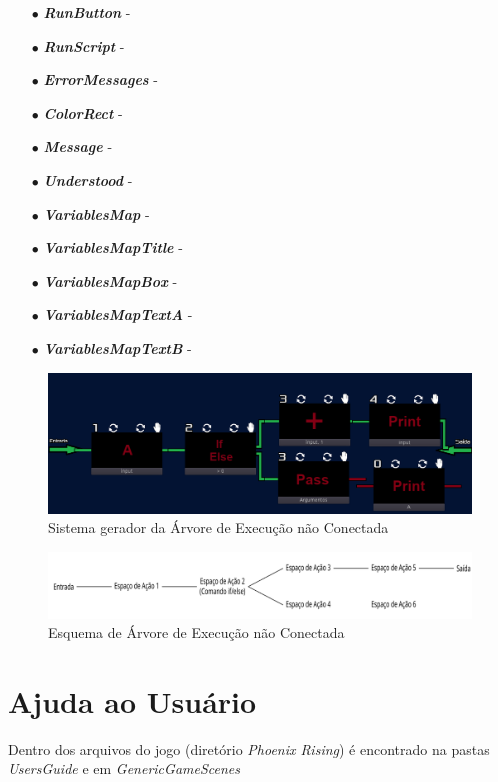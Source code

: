 \begin{itemize}
    \item[$\bullet$]
        \textbf{\textit{RunButton}} -
    \item[$\bullet$]
        \textbf{\textit{RunScript}} - 
    \item[$\bullet$]
        \textbf{\textit{ErrorMessages}} - 
    \item[$\bullet$] 
        \textbf{\textit{ColorRect}} - 
    \item[$\bullet$]
        \textbf{\textit{Message}} - 
    \item[$\bullet$]
        \textbf{\textit{Understood}} - 
    \item[$\bullet$] 
        \textbf{\textit{VariablesMap}} - 
    \item[$\bullet$] 
        \textbf{\textit{VariablesMapTitle}} - 
    \item[$\bullet$]
        \textbf{\textit{VariablesMapBox}} - 
    \item[$\bullet$] 
        \textbf{\textit{VariablesMapTextA}} - 
    \item[$\bullet$] 
        \textbf{\textit{VariablesMapTextB}} - 
\end{itemize}



\begin{figure}[H]
    \includegraphics[width=\textwidth]{../figuras/sistema_nao_conectado_arvore_execucao.png}
    \caption{Sistema gerador da Árvore de Execução não Conectada}
\end{figure}

\begin{figure}[H]
    \includegraphics[width=\textwidth]{../figuras/arvore_execucao_nao_conectada.png}
    \caption{Esquema de Árvore de Execução não Conectada}
\end{figure}

\section{Ajuda ao Usuário}

Dentro dos arquivos do jogo (diretório \textit{Phoenix Rising}) é encontrado na
pastas \textit{UsersGuide} e em \textit{GenericGameScenes} 



